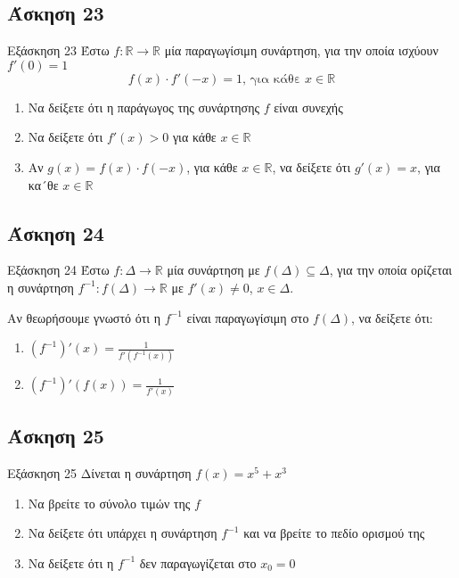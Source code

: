 \documentclass[greek]{beamer}
\begin{document}
\subsection{Άσκηση 23}
\begin{frame}[label=Άσκηση23]{Εξάσκηση 23}
  Έστω $f:\mathbb{R}\to\mathbb{R}$ μία παραγωγίσιμη συνάρτηση, για την οποία ισχύουν $f'(0)=1$
  $$f(x)\cdot f'(-x)=1 \text{, για κάθε } x\in\mathbb{R}$$
  \begin{enumerate}
    \item<1-> Να δείξετε ότι η παράγωγος της συνάρτησης $f$ είναι συνεχής
    \item<2-> Να δείξετε ότι $f'(x)>0$ για κάθε $x\in\mathbb{R}$
    \item<3-> Αν $g(x)=f(x)\cdot f(-x)$, για κάθε $x\in\mathbb{R}$, να δείξετε ότι $g'(x)=x$, για κα´θε $x\in\mathbb{R}$
  \end{enumerate}

\end{frame}

\subsection{Άσκηση 24}
\begin{frame}[label=Άσκηση24]{Εξάσκηση 24}
  Έστω $f:Δ\to\mathbb{R}$ μία συνάρτηση με $f(Δ)\subseteq Δ$, για την οποία ορίζεται η συνάρτηση $f^{-1}:f(Δ)\to\mathbb{R}$ με $f'(x)\ne 0$, $x\in Δ$.

  Αν θεωρήσουμε γνωστό ότι η $f^{-1}$ είναι παραγωγίσιμη στο $f(Δ)$, να δείξετε ότι:
  \begin{enumerate}
    \item<1-> $(f^{-1})'(x)=\frac{1}{f'(f^{-1}(x))}$
    \item<2-> $(f^{-1})'(f(x))=\frac{1}{f'(x)}$
  \end{enumerate}

\end{frame}

\subsection{Άσκηση 25}
\begin{frame}[label=Άσκηση25]{Εξάσκηση 25}
  Δίνεται η συνάρτηση $f(x)=x^5+x^3$
  \begin{enumerate}
    \item<1-> Να βρείτε το σύνολο τιμών της $f$
    \item<2-> Να δείξετε ότι υπάρχει η συνάρτηση $f^{-1}$ και να βρείτε το πεδίο ορισμού της
    \item<3-> Να δείξετε ότι η $f^{-1}$ δεν παραγωγίζεται στο $x_0=0$
  \end{enumerate}

\end{frame}
\end{document}
